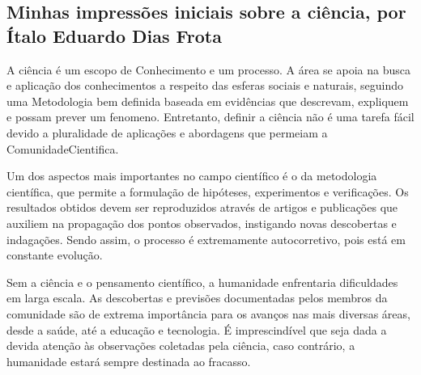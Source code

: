 \subsection{Minhas impressões iniciais sobre a ciência, por Ítalo Eduardo Dias Frota}

A ciência é um escopo de \gls{Conhecimento} e um processo. A área se apoia na busca e aplicação dos conhecimentos a respeito das esferas sociais e naturais, seguindo uma \gls{Metodologia} bem definida baseada em evidências que descrevam, expliquem e possam prever um \gls{fenomeno}. Entretanto, definir a ciência não é uma tarefa fácil devido a pluralidade de aplicações e abordagens que permeiam a \gls{ComunidadeCientifica}.

Um dos aspectos mais importantes no campo científico é o da metodologia científica, que permite a formulação de hipóteses, experimentos  e verificações. Os resultados obtidos devem ser reproduzidos através de artigos e publicações que auxiliem na propagação dos pontos observados, instigando novas descobertas e indagações. Sendo assim, o processo é extremamente autocorretivo, pois está em constante evolução.

Sem a ciência e o pensamento científico, a humanidade enfrentaria dificuldades em larga escala. As descobertas e previsões documentadas pelos membros da comunidade são de extrema importância para os avanços nas mais diversas áreas, desde a saúde, até a educação e tecnologia. É imprescindível que seja dada a devida atenção às observações coletadas pela ciência, caso contrário, a humanidade estará sempre destinada ao fracasso.
